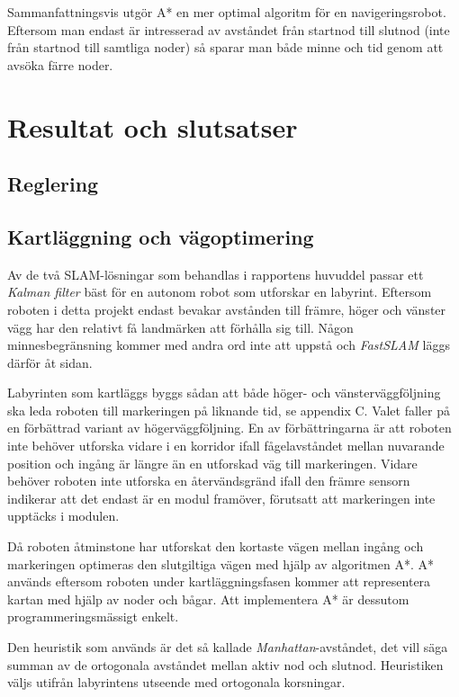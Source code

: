 \documentclass[11pt]{article}
\begin{document}
\begin{flushleft}
Sammanfattningsvis utgör A* en mer optimal algoritm för en navigeringsrobot. Eftersom man endast är intresserad av avståndet från startnod till slutnod (inte från startnod till samtliga noder) så sparar man både minne och tid genom att avsöka färre noder. 

\pagebreak
\section{Resultat och slutsatser}
\subsection{Reglering}

\subsection{Kartläggning och vägoptimering}
Av de två SLAM-lösningar som behandlas i rapportens huvuddel passar ett \emph{Kalman filter} bäst för en autonom robot som utforskar en labyrint.  Eftersom roboten i detta projekt endast bevakar avstånden till främre, höger och vänster vägg har den relativt få landmärken att förhålla sig till. Någon minnesbegränsning kommer med andra ord inte att uppstå och \emph{FastSLAM} läggs därför åt sidan.

Labyrinten som kartläggs byggs sådan att både höger- och vänsterväggföljning ska leda roboten till markeringen på liknande tid, se appendix C. Valet faller på en förbättrad variant av högerväggföljning. En av förbättringarna är att roboten inte behöver utforska vidare i en korridor ifall fågelavståndet mellan nuvarande position och ingång är längre än en utforskad väg till markeringen. Vidare behöver roboten inte utforska en återvändsgränd ifall den främre sensorn indikerar att det endast är en modul framöver, förutsatt att markeringen inte upptäcks i modulen. 

Då roboten åtminstone har utforskat den kortaste vägen mellan ingång och markeringen optimeras den slutgiltiga vägen med hjälp av algoritmen A*. A* används eftersom roboten under kartläggningsfasen kommer att representera kartan med hjälp av noder och bågar. Att implementera A* är dessutom programmeringsmässigt enkelt.

Den heuristik som används är det så kallade \emph{Manhattan}-avståndet, det vill säga summan av de ortogonala avståndet mellan aktiv nod och slutnod. Heuristiken väljs utifrån labyrintens utseende med ortogonala korsningar. 


\end{flushleft}
\end{document}
